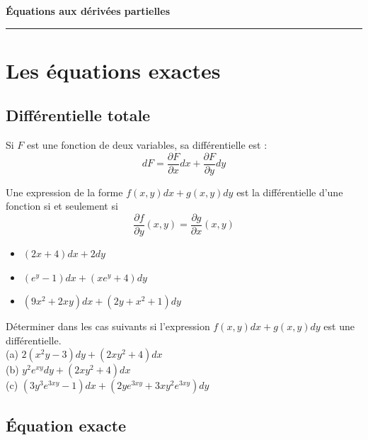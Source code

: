 \documentclass[12pt]{article}
\newcounter{definition}
\newcounter{proposition}
\newcounter{exemple}
\newcounter{exercice}
\begin{document}
\begin{center}
{\Huge\bfseries Équations aux dérivées partielles}\\[1em]
\rule{\textwidth}{1pt}
\end{center}
\vspace{1em}

\section{Les équations exactes}

\subsection{Différentielle totale}

\begin{definition}
Si $F$ est une fonction de deux variables, sa différentielle est :
$$
dF = \frac{\partial F}{\partial x} dx + \frac{\partial F}{\partial y} dy
$$
\end{definition}

\begin{proposition}
Une expression de la forme $f(x, y) dx + g(x, y) dy$ est la différentielle d'une fonction si et seulement si
$$
\frac{\partial f}{\partial y}(x, y) = \frac{\partial g}{\partial x}(x, y)
$$
\end{proposition}

\begin{exemple}
\begin{itemize}
  \item $(2x+4) dx + 2 dy$
  \item $\left(e^{y}-1\right) dx + \left(x e^{y}+4\right) dy$
  \item $\left(9 x^{2}+2 x y\right) dx + \left(2 y+x^{2}+1\right) dy$
\end{itemize}
\end{exemple}

\begin{exercice}
Déterminer dans les cas suivants si l'expression $f(x, y) dx + g(x, y) dy$ est une différentielle.\\
(a) $2\left(x^{2} y-3\right) dy + \left(2 x y^{2}+4\right) dx$\\
(b) $y^{2} e^{x y} dy + \left(2 x y^{2}+4\right) dx$\\
(c) $\left(3 y^{3} e^{3 x y}-1\right) dx + \left(2 y e^{3 x y}+3 x y^{2} e^{3 x y}\right) dy$
\end{exercice}

\subsection{Équation exacte}
\end{document}
